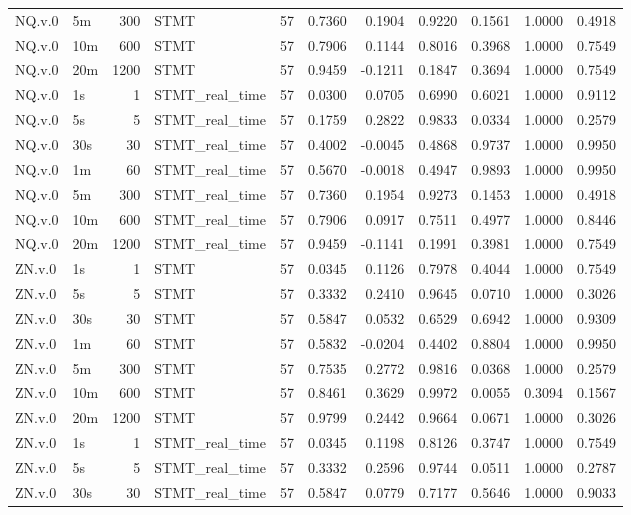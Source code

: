 \begin{tabular}{llrlrrrrrrr}
NQ.v.0 & 5m & 300 & STMT & 57 & 0.7360 & 0.1904 & 0.9220 & 0.1561 & 1.0000 & 0.4918 \\
NQ.v.0 & 10m & 600 & STMT & 57 & 0.7906 & 0.1144 & 0.8016 & 0.3968 & 1.0000 & 0.7549 \\
NQ.v.0 & 20m & 1200 & STMT & 57 & 0.9459 & -0.1211 & 0.1847 & 0.3694 & 1.0000 & 0.7549 \\
NQ.v.0 & 1s & 1 & STMT_real_time & 57 & 0.0300 & 0.0705 & 0.6990 & 0.6021 & 1.0000 & 0.9112 \\
NQ.v.0 & 5s & 5 & STMT_real_time & 57 & 0.1759 & 0.2822 & 0.9833 & 0.0334 & 1.0000 & 0.2579 \\
NQ.v.0 & 30s & 30 & STMT_real_time & 57 & 0.4002 & -0.0045 & 0.4868 & 0.9737 & 1.0000 & 0.9950 \\
NQ.v.0 & 1m & 60 & STMT_real_time & 57 & 0.5670 & -0.0018 & 0.4947 & 0.9893 & 1.0000 & 0.9950 \\
NQ.v.0 & 5m & 300 & STMT_real_time & 57 & 0.7360 & 0.1954 & 0.9273 & 0.1453 & 1.0000 & 0.4918 \\
NQ.v.0 & 10m & 600 & STMT_real_time & 57 & 0.7906 & 0.0917 & 0.7511 & 0.4977 & 1.0000 & 0.8446 \\
NQ.v.0 & 20m & 1200 & STMT_real_time & 57 & 0.9459 & -0.1141 & 0.1991 & 0.3981 & 1.0000 & 0.7549 \\
ZN.v.0 & 1s & 1 & STMT & 57 & 0.0345 & 0.1126 & 0.7978 & 0.4044 & 1.0000 & 0.7549 \\
ZN.v.0 & 5s & 5 & STMT & 57 & 0.3332 & 0.2410 & 0.9645 & 0.0710 & 1.0000 & 0.3026 \\
ZN.v.0 & 30s & 30 & STMT & 57 & 0.5847 & 0.0532 & 0.6529 & 0.6942 & 1.0000 & 0.9309 \\
ZN.v.0 & 1m & 60 & STMT & 57 & 0.5832 & -0.0204 & 0.4402 & 0.8804 & 1.0000 & 0.9950 \\
ZN.v.0 & 5m & 300 & STMT & 57 & 0.7535 & 0.2772 & 0.9816 & 0.0368 & 1.0000 & 0.2579 \\
ZN.v.0 & 10m & 600 & STMT & 57 & 0.8461 & 0.3629 & 0.9972 & 0.0055 & 0.3094 & 0.1567 \\
ZN.v.0 & 20m & 1200 & STMT & 57 & 0.9799 & 0.2442 & 0.9664 & 0.0671 & 1.0000 & 0.3026 \\
ZN.v.0 & 1s & 1 & STMT_real_time & 57 & 0.0345 & 0.1198 & 0.8126 & 0.3747 & 1.0000 & 0.7549 \\
ZN.v.0 & 5s & 5 & STMT_real_time & 57 & 0.3332 & 0.2596 & 0.9744 & 0.0511 & 1.0000 & 0.2787 \\
ZN.v.0 & 30s & 30 & STMT_real_time & 57 & 0.5847 & 0.0779 & 0.7177 & 0.5646 & 1.0000 & 0.9033 \\

\end{tabular}
